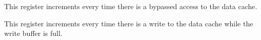 This register increments every time there is a bypassed access to the data cache.

\implementation{}


This register increments every time there is a write to the data cache while
the write buffer is full.

\implementation{}
